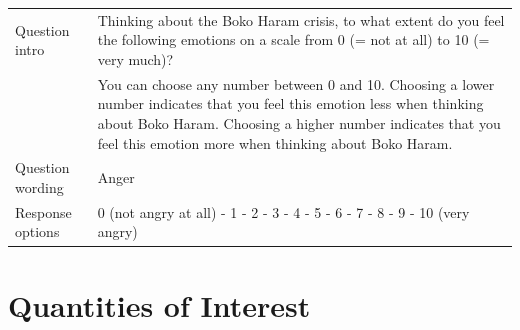 \begin{mdframed}
\begin{table}[H]
\begin{tabular}{lp{9.6cm}}
Question intro      & Thinking about the Boko Haram crisis, to what extent do you feel the following emotions on a scale from 0 (= not at all) to 10 (= very much)? \\
                    & You can choose any number between 0 and 10. Choosing a lower number indicates that you feel this emotion less when thinking about Boko Haram. Choosing a higher number indicates that you feel this emotion more when thinking about Boko Haram.\\
Question wording    & Anger \\
Response options    & 0 (not angry at all) - 1 - 2 - 3 - 4 - 5 - 6 - 7 - 8 - 9 - 10 (very angry) \\
\end{tabular}
\end{table}
\end{mdframed}


\section{Quantities of Interest}
\label{app:C2}
